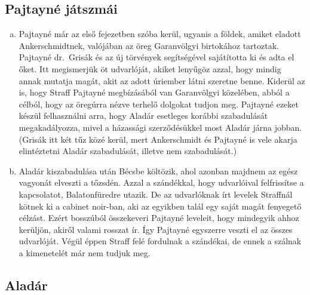 \documentclass{thesis-ekf}
\begin{document}
    \subsection{Pajtayné játszmái}

    \begin{enumerate}[a)]
        \item\label{itm:Corinna-udvarlok} Pajtayné már az első fejezetben szóba kerül, ugyanis a földek, amiket eladott
            Ankerschmidtnek, valójában az öreg Garanvölgyi birtokához tartoztak.
        Pajtayné dr.~Grisák és az új törvények segítségével sajátította ki és adta el őket.
        Itt megismerjük öt udvarlóját, akiket lenyűgöz azzal, hogy mindig annak mutatja magát,
            akit az adott úriember látni szeretne benne.
        Kiderül az is, hogy Straff Pajtayné megbízásából van Garanvölgyi közelében, abból a célból,
            hogy az öregúrra nézve terhelő dolgokat tudjon meg.
        Pajtayné ezeket készül felhasználni arra, hogy Aladár esetleges korábbi szabadulását megakadályozza,
            mivel a házassági szerződésükkel most Aladár járna jobban.
        (Grisák itt két tűz közé kerül, mert Ankerschmidt és Pajtayné is vele akarja elintéztetni Aladár szabadulását,
            illetve nem szabadulását.)
        \item\label{itm:Corinna-Bfured} Aladár kiszabadulása után Bécsbe költözik, ahol azonban majdnem az egész vagyonát elveszti a tőzsdén.
        Azzal a szándékkal, hogy udvarlóival felfrissítse a kapcsolatot, Balatonfüredre utazik.
        De az udvarlóknak írt levelek Straffnál kötnek ki a cabinet noir-ban, aki az egyikben talál egy saját magát fenyegető célzást.
        Ezért bosszúból összekeveri Pajtayné leveleit, hogy mindegyik ahhoz kerüljön, akiről valami rosszat ír.
        Így Pajtayné egyszerre veszti el az összes udvarlóját.
        Végül éppen Straff felé fordulnak a szándékai, de ennek a szálnak a kimenetelét már nem tudjuk meg.
    \end{enumerate}

    \subsection{Aladár}
\end{document}
